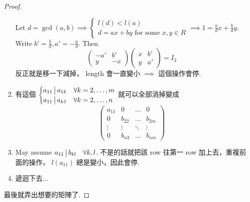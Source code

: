 \begin{theorem}
\begin{proof}
\begin{enumerate}
        Let $d = \gcd(a, b) \implies \begin{cases}
          l(d) < l(a) \\
          d = ax + by \text{~for some~} x, y \in R
        \end{cases} \implies 1 = \frac{a}{d}x + \frac{b}{d}y$.
        Write $b' = \frac{b}{d}, a' = -\frac{a}{d}$.
        Then
        \[
          \begin{pmatrix} -a' & b' \\ y & -x \end{pmatrix}
          \begin{pmatrix} x & b' \\ y & a' \end{pmatrix}
          = I_2
        \]
        反正就是移一下減掉， length 會一直變小 $\implies$ 這個操作會停.
      \item 有這個 $\begin{cases}
          a_{11} \,\big|\, a_{1k} & \forall k = 2, \dots, m \\
          a_{11} \,\big|\, a_{k1} & \forall k = 2, \dots, n
        \end{cases}$ 就可以全部消掉變成
        \[
          \begin{pmatrix}
            a_{11} & 0 & \dots & 0 \\
            0 & b_{22} & \dots & b_{2m}\\
            \vdots & \vdots & \ddots & \vdots \\
            0 & b_{n2} & \dots & b_{nm}
          \end{pmatrix}
        \]
      \item May assume $a_{11} \,\big|\, b_{kl} \quad \forall k, l$.
        不是的話就把該 row 往第一 row 加上去，重複前面的操作，
        $l(a_{11})$ 總是變小，因此會停.
      \item 遞迴下去...
    \end{enumerate}
    最後就弄出想要的矩陣了.
  \end{proof}
\end{theorem}

